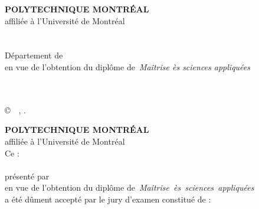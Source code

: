 \documentclass[letterpaper,12pt,oneside,final]{book}
\newcommand\monDipl{Maîtrise ès sciences appliquées}
\begin{document}


\frontmatter
\thispagestyle{empty}%
\begin{center}%
\textbf{POLYTECHNIQUE MONTRÉAL}\\
affiliée à l'Université de Montréal\\
\textbf{\monTitre}\\
\textbf{\MakeUppercase{\monPrenom~\monNom}}\\
Département de~{\monDepartement}\\
 en vue de l'obtention du diplôme de~\emph{\monDipl}\\
\maDiscipline\\
\vskip 0.4in
\moisDepot~\anneeDepot
\end{center}%
\copyright~\monPrenom~\monNom, \anneeDepot.
\newpage\thispagestyle{empty}%
\begin{center}%

\textbf{POLYTECHNIQUE MONTRÉAL}\\
affiliée à l'Université de Montréal\\
Ce :\\
\textbf{\monTitre}\\
présenté
par~\textbf{\mbox{\monPrenom~\MakeUppercase{\monNom}}}\\
en vue de l'obtention du diplôme de~\emph{\mbox{\monDipl}}\\
a été dûment accepté par le jury d'examen constitué de :\end{center}
\monJury
\pagestyle{pagenumber}%
\end{document}

